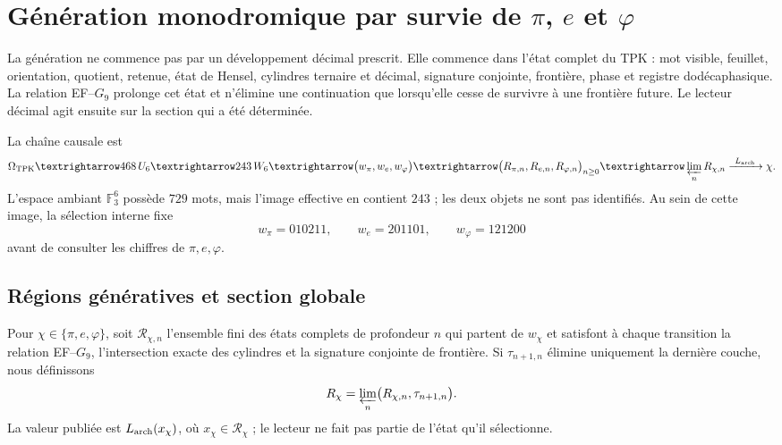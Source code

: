 \chapter{Génération monodromique par survie de
\texorpdfstring{\(\pi\), \(e\) et \(\varphi\)}{pi, e et phi}}
\label{chap:generacion-numeros-rev6}
\label{chap:biografias-numeros-rev6}

La génération ne commence pas par un développement décimal prescrit. Elle commence dans
l'état complet du TPK : mot visible, feuillet, orientation, quotient,
retenue, état de Hensel, cylindres ternaire et décimal, signature conjointe,
frontière, phase et registre dodécaphasique. La relation EF--\(G_9\) prolonge cet
état et n'élimine une continuation que lorsqu'elle cesse de survivre à une
frontière future. Le lecteur décimal agit ensuite sur la section qui a
été déterminée.

La chaîne causale est
\[
\Omega_{\rm TPK}
\longrightarrow 468\,\mathcal U_6
\longrightarrow 243\,\mathcal W_6
\longrightarrow
\bigl(w_\pi,w_e,w_\varphi\bigr)
\longrightarrow
\bigl(\mathcal R_{\pi,n},\mathcal R_{e,n},
      \mathcal R_{\varphi,n}\bigr)_{n\geq0}
\longrightarrow
\varprojlim_n\mathcal R_{\chi,n}
\xrightarrow{\ L_{\rm arch}\ }
\chi .
\]
L'espace ambiant \(\mathbb F_3^6\) possède \(729\) mots, mais l'image
effective en contient \(243\) ; les deux objets ne sont pas identifiés. Au sein de cette
image, la sélection interne fixe
\[
w_\pi=010211,\qquad
w_e=201101,\qquad
w_\varphi=121200
\]
avant de consulter les chiffres de \(\pi,e,\varphi\).

\section{Régions génératives et section globale}

\begin{definition}
\label{def:region-generativa-rev6}
Pour \(\chi\in\{\pi,e,\varphi\}\), soit \(\mathcal R_{\chi,n}\) l'ensemble
fini des états complets de profondeur \(n\) qui partent de
\(w_\chi\) et satisfont à chaque transition la relation EF--\(G_9\),
l'intersection exacte des cylindres et la signature conjointe de frontière. Si
\(\tau_{n+1,n}\) élimine uniquement la dernière couche, nous définissons
\[
\mathcal R_\chi
=\varprojlim_n
\bigl(\mathcal R_{\chi,n},\tau_{n+1,n}\bigr).
\]
La valeur publiée est \(L_{\rm arch}(x_\chi)\), où
\(x_\chi\in\mathcal R_\chi\) ; le lecteur ne fait pas partie de l'état qu'il
sélectionne.
\end{definition}

